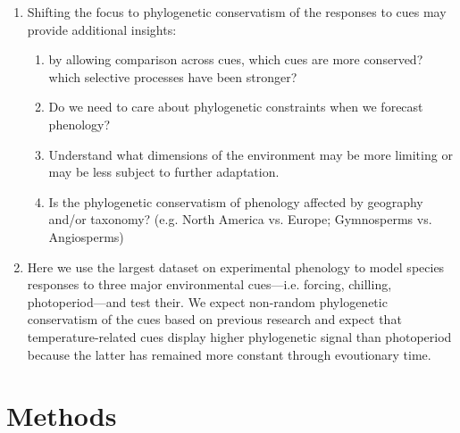 \documentclass{article}\usepackage[]{graphicx}\usepackage[]{color}
\begin{document}
\begin{enumerate}
\item Shifting the focus to phylogenetic conservatism of the responses to cues may provide additional insights:
\begin{enumerate}
\item by allowing comparison across cues, which cues are more conserved? which selective processes have been stronger? 
\item Do we need to care about phylogenetic constraints when we forecast phenology? 
\item Understand what dimensions of the environment may be more limiting or may be less subject to further adaptation. 
\item Is the phylogenetic conservatism of phenology affected by geography and/or taxonomy? (e.g. North America vs. Europe; Gymnosperms vs. Angiosperms) 
\end{enumerate}

\item Here we use the largest dataset on experimental phenology to model species responses to three major environmental cues---i.e. forcing, chilling, photoperiod---and test their. We expect non-random phylogenetic conservatism of the cues based on previous research \citep{davies2013phylogenetic,rafferty2017global,joly2019importance} and expect that temperature-related cues display higher phylogenetic signal than photoperiod because the latter has remained more constant through evoutionary time. %

\end{enumerate}



\clearpage



\section*{Methods}
\end{document}
